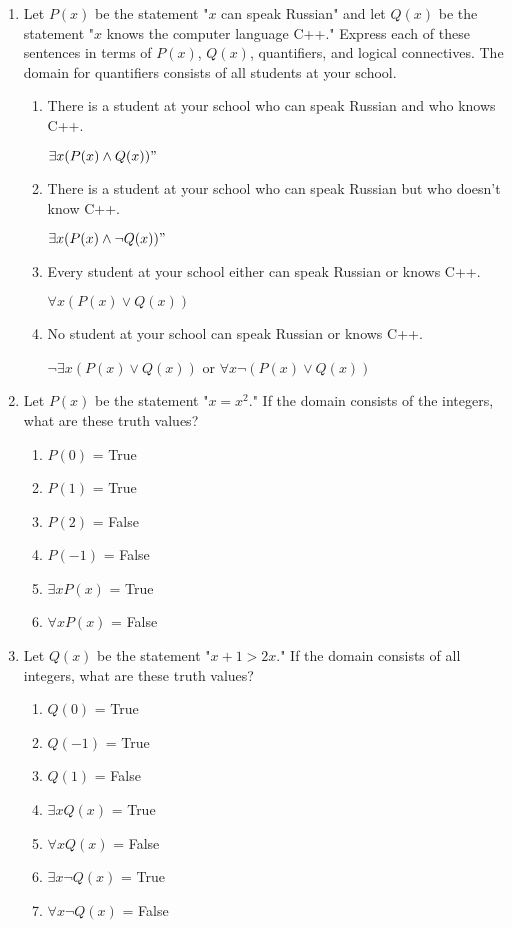 \documentclass[11pt]{article}
\begin{document}
\begin{enumerate}[label=\textbf{\arabic*.}]
	\item Let $P(x)$ be the statement "$x$ can speak Russian" and let $Q(x)$ be the statement "$x$ knows the computer language C++." Express each of these sentences in terms of $P(x)$, $Q(x)$, quantifiers, and logical connectives. The domain for quantifiers consists of all students at your school.
	\begin{enumerate}[label=\textbf{\alph*)}]
		\item There is a student at your school who can speak Russian and who knows C++.
		
		$\exists x(P(x) \land Q(x))"$
		
		\item There is a student at your school who can speak Russian but who doesn't know C++.
		
		$\exists x(P(x) \land \neg Q(x))"$
		
		\item Every student at your school either can speak Russian or knows C++.
		
		$\forall x(P(x) \lor Q(x))$
		
		\item No student at your school can speak Russian or knows C++.
		
		$\neg \exists x(P(x) \lor Q(x))$ or $\forall x\neg(P(x) \lor Q(x))$
	\end{enumerate}

	\item Let $P(x)$ be the statement "$x = x^2$." If the domain consists of the integers, what are these truth values?
	\begin{enumerate}[label=\textbf{\alph*)}]
		\item $P(0)$ = True
		\item $P(1)$ = True
		\item $P(2)$ = False
		\item $P(-1)$ = False
		\item $\exists xP(x)$ = True
		\item $\forall xP(x)$ = False
	\end{enumerate}

	\item Let $Q(x)$ be the statement "$x + 1 > 2x$." If the domain consists of all integers, what are these truth values?
	\begin{enumerate}[label=\textbf{\alph*)}]
		\item $Q(0)$ = True
		\item $Q(-1)$ = True
		\item $Q(1)$ = False
		\item $\exists xQ(x)$ = True
		\item $\forall xQ(x)$ = False
		\item $\exists x\neg Q(x)$ = True
		\item $\forall x\neg Q(x)$ = False
	\end{enumerate}


\end{enumerate}
\end{document}
